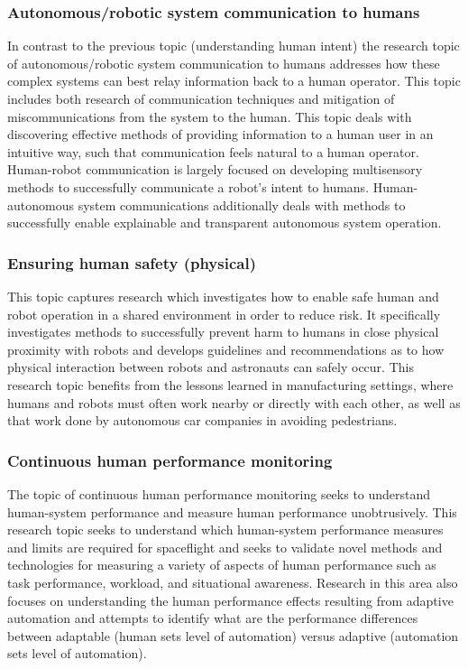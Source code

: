 \subsubsection{Autonomous/robotic system communication to humans}
In contrast to the previous topic (understanding human intent) the research topic of autonomous/robotic system communication to humans addresses how these complex systems can best relay information back to a human operator.
This topic includes both research of communication techniques and mitigation of miscommunications from the system to the human.
This topic deals with discovering effective methods of providing information to a human user in an intuitive way, such that communication feels natural to a human operator.
Human-robot communication is largely focused on developing multisensory methods to successfully communicate a robot's intent to humans.
Human-autonomous system communications additionally deals with methods to successfully enable explainable and transparent autonomous system operation.

\subsubsection{Ensuring human safety (physical)}
This topic captures research which investigates how to enable safe human and robot operation in a shared environment in order to reduce risk.
It specifically investigates methods to successfully prevent harm to humans in close physical proximity with robots and develops guidelines and recommendations as to how physical interaction between robots and astronauts can safely occur.
This research topic benefits from the lessons learned in manufacturing settings, where humans and robots must often work nearby or directly with each other, as well as that work done by autonomous car companies in avoiding pedestrians.

\subsubsection{Continuous human performance monitoring}
The topic of continuous human performance monitoring seeks to understand human-system performance and measure human performance unobtrusively.
This research topic seeks to understand which human-system performance measures and limits are required for spaceflight and seeks to validate novel methods and technologies for measuring a variety of aspects of human performance such as task performance, workload, and situational awareness.
Research in this area also focuses on understanding the human performance effects resulting from adaptive automation and attempts to identify what are the performance differences between adaptable (human sets level of automation) versus adaptive (automation sets level of automation).

